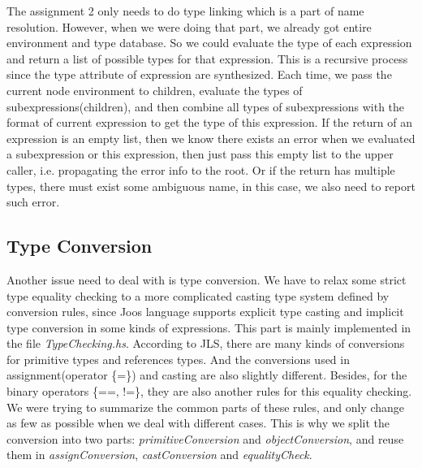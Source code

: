 \documentclass[12pt,letterpaper]{article}
\begin{document}
The assignment 2 only needs to do type linking which is a part of name resolution. However, when we were doing that part, we already got entire environment and type database.
So we could evaluate the type of each expression and return a list of possible types for that expression.
This is a recursive process since the type attribute of expression are synthesized.
Each time, we pass the current node environment to children, evaluate the types of subexpressions(children), and then combine all types of subexpressions with the format of current expression to get the type of this expression. 
If the return of an expression is an empty list, then we know there exists an error when we evaluated a subexpression or this expression, then just pass this empty list to the upper caller, i.e. propagating the error info to the root.
Or if the return has multiple types, there must exist some ambiguous name, in this case, we also need to report such error.

\subsection{Type Conversion}

Another issue need to deal with is type conversion.
We have to relax some strict type equality checking to a more complicated casting type system defined by conversion rules, since Joos language supports explicit type casting and implicit type conversion in some kinds of expressions.
This part is mainly implemented in the file \emph{TypeChecking.hs}.
According to JLS, there are many kinds of conversions for primitive types and references types.
And the conversions used in assignment(operator \{=\}) and casting are also slightly different.
Besides, for the binary operators \{==, !=\}, they are also another rules for this equality checking.
We were trying to summarize the common parts of these rules, and only change as few as possible when we deal with different cases.
This is why we split the conversion into two parts: \emph{primitiveConversion} and \emph{objectConversion}, and reuse them in \emph{assignConversion}, \emph{castConversion} and \emph{equalityCheck}.




\end{document}
